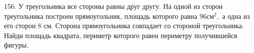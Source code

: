 156. У треугольника все стороны равны друг другу. На одной из сторон треугольника построен прямоугольник, площадь которого равна $96\text{см}^2,$ а одна из его сторон 8 см. Сторона прямоугольника совпадает со стороной треугольника. Найди площадь квадрата, периметр которого равен периметру получившейся фигуры.\\
